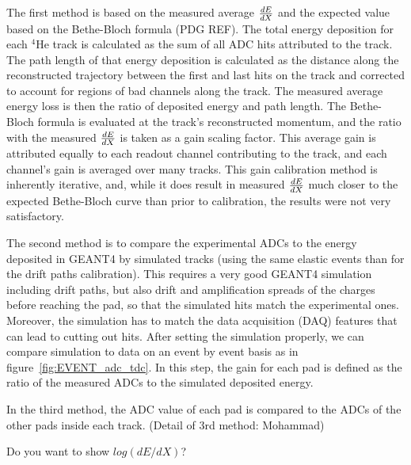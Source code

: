 \documentclass[twocolumn,showpacs,superscriptaddress,groupedaddress]{revtex4}
\begin{document}
The first method is based on the measured average $\small{\frac{dE}{dX}}$
and the expected value based on the Bethe-Bloch formula (PDG REF).  The total energy
deposition for each $^4$He track is calculated as the sum of all ADC hits
attributed to the track.  The path length of that energy deposition is
calculated as the distance along the reconstructed trajectory between the first
and last hits on the track and corrected to account for regions
of bad channels along the track.  The measured average energy loss is then the
ratio of deposited energy and path length.  The Bethe-Bloch formula is
evaluated at the track's reconstructed momentum, and the ratio with the measured
$\small{\frac{dE}{dX}}$ is taken as a gain scaling factor.  This average gain is
attributed equally to each readout channel contributing to the track, and each
channel's gain is averaged over many tracks.  This gain calibration method is
inherently iterative, and, while it does result in measured $\small{\frac{dE}{dX}}$
much closer to the expected Bethe-Bloch curve than prior to calibration, the
results were not very satisfactory.

The second method is to compare the experimental ADCs to the energy deposited in 
GEANT4 by simulated tracks (using the same elastic events than for the drift 
paths calibration).  This requires a very good GEANT4 simulation 
including drift paths, but also drift and amplification spreads of the charges 
before reaching the pad, so that the simulated hits match the experimental 
ones. Moreover, the simulation has to match the data acquisition (DAQ) features 
that can lead to cutting out hits. After setting the simulation properly, we 
can compare simulation to data on an event by event basis as in 
figure~\ref{fig:EVENT_adc_tdc}. In this step, the gain for each pad is defined 
as the ratio of the measured ADCs to the simulated deposited energy.

In the third method, the ADC value of each pad is compared to 
the ADCs of the other pads inside each track.
(Detail of 3rd method: Mohammad)

Do you want to show $log(dE/dX)$?
\end{document}

